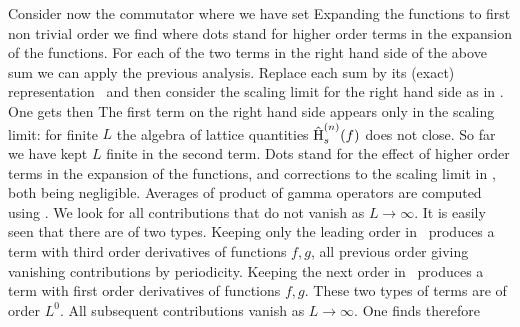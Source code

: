 Consider now the commutator
%
\eqn{}
%
where we have set
%
\eqn{}
%
Expanding the functions to first non trivial order we find
%
\eqn{}
%
where dots stand for higher order terms in the expansion
of the functions. For each of the two terms in the right hand side of the
above sum we can apply the previous analysis.
 Replace each sum
by its (exact) representation \eqqi\ and then consider the scaling limit for
the
right hand side  as in \viri. One
gets then
%
\eqn{}
%
The first term on the right hand side appears only in  the scaling limit: for
finite
$L$ the algebra of lattice quantities $\hat{\hbox{H}}^{(n)}_s(f)$ does not
close.
So far we have kept $L$ finite in the  second term. Dots stand for the effect
of
higher order terms in the expansion of the functions, and corrections
to the scaling limit in \eqqi, both being negligible.
 Averages of product of gamma operators are computed
using \fermcorr. We look for all contributions that do not vanish
 as $L\rightarrow\infty$. It is easily seen that there are of two types.
Keeping only the
leading order in \fermcorr\ produces a term with third order derivatives of
functions
$f,g$, all previous order giving vanishing contributions by periodicity.
Keeping the
next order in \fermcorr\ produces a term with first order derivatives
of functions $f,g$. These two types of terms are of order $L^0$. All subsequent
contributions
vanish as $L\rightarrow\infty$. One finds therefore
%
\eqn{}
%

